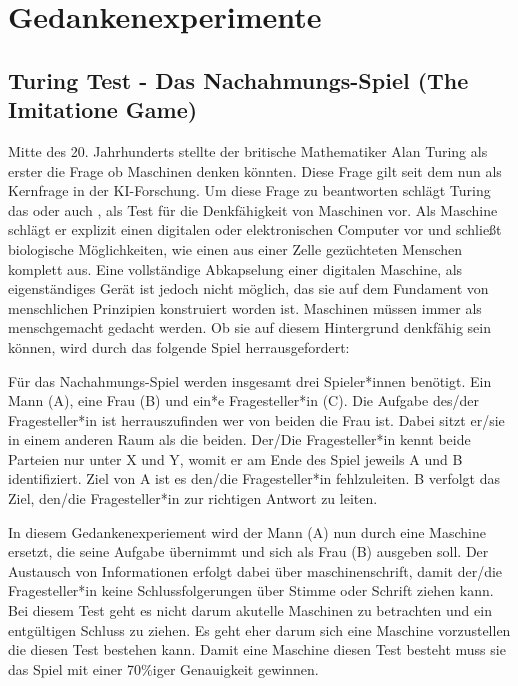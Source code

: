 \documentclass[a4paper,12pt,german,ngerman]{report}
\begin{document}
    \chapter{Gedankenexperimente}

    \section{Turing Test - Das Nachahmungs-Spiel (The Imitatione Game) }
    Mitte des 20. Jahrhunderts stellte der britische Mathematiker Alan Turing als erster die Frage ob Maschinen denken könnten.
    Diese Frage gilt seit dem nun als Kernfrage in der KI-Forschung. Um diese Frage zu beantworten schlägt Turing das
     oder auch , als Test für die Denkfähigkeit von Maschinen vor.
    Als Maschine schlägt er explizit einen digitalen oder elektronischen Computer vor und schließt
    biologische Möglichkeiten, wie einen aus einer Zelle gezüchteten Menschen komplett aus.\cite[435]{turing1950computing}
    Eine vollständige Abkapselung einer digitalen Maschine, als eigenständiges Gerät ist jedoch nicht möglich, das sie auf dem
    Fundament von menschlichen Prinzipien konstruiert worden ist. Maschinen müssen immer als menschgemacht gedacht werden.
    Ob sie auf diesem Hintergrund denkfähig sein können, wird durch das folgende Spiel herrausgefordert:
    \begin{displayquote}
        Für das Nachahmungs-Spiel werden insgesamt drei Spieler*innen benötigt. Ein Mann (A), eine Frau (B) und ein*e
        Fragesteller*in (C). Die Aufgabe des/der Fragesteller*in ist herrauszufinden wer von beiden die Frau ist.
        Dabei sitzt er/sie in einem anderen Raum als die beiden. Der/Die Fragesteller*in kennt beide Parteien
        nur unter X und Y, womit er am Ende des Spiel jeweils A und B identifiziert. Ziel von A ist es den/die Fragesteller*in
        fehlzuleiten. B verfolgt das Ziel, den/die Fragesteller*in zur richtigen Antwort zu leiten.
        \cite[433]{turing1950computing}
    \end{displayquote}
    In diesem Gedankenexperiement wird der Mann (A) nun durch eine Maschine ersetzt, die seine Aufgabe übernimmt und
    sich als Frau (B) ausgeben soll. Der Austausch von Informationen erfolgt dabei über maschinenschrift, damit
    der/die Fragesteller*in keine Schlussfolgerungen über Stimme oder Schrift ziehen kann.\cite[433]{turing1950computing}
    Bei diesem Test geht es nicht darum akutelle Maschinen zu betrachten und ein entgültigen Schluss zu ziehen. Es geht
    eher darum sich eine Maschine vorzustellen die diesen Test bestehen kann. Damit eine Maschine diesen Test besteht
    muss sie das Spiel mit einer 70\%iger Genauigkeit gewinnen.\cite[1]{oppy&dowe2020turingtest}
\end{document}
